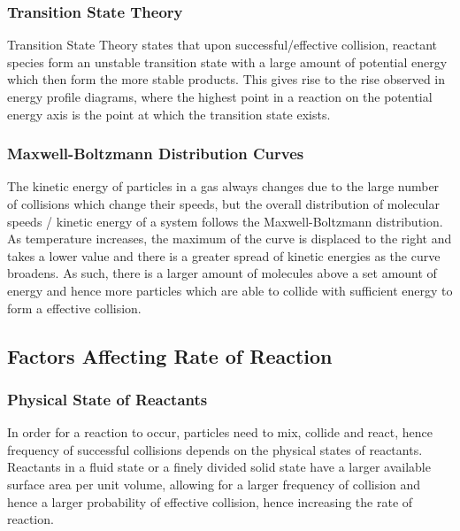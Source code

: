 \documentclass[../main]{subfiles}
\begin{document}
	\subsubsection{Transition State Theory}

	Transition State Theory states that upon successful/effective collision, reactant species form an unstable transition state with a large amount of potential energy which then form the more stable products. This gives rise to the rise observed in energy profile diagrams, where the highest point in a reaction on the potential energy axis is the point at which the transition state exists.

	\subsubsection{Maxwell-Boltzmann Distribution Curves}

	The kinetic energy of particles in a gas always changes due to the large number of collisions which change their speeds, but the overall distribution of molecular speeds / kinetic energy of a system follows the Maxwell-Boltzmann distribution. As temperature increases, the maximum of the curve is displaced to the right and takes a lower value and there is a greater spread of kinetic energies as the curve broadens. As such, there is a larger amount of molecules above a set amount of energy and hence more particles which are able to collide with sufficient energy to form a effective collision.

	\subsection{Factors Affecting Rate of Reaction}

	\subsubsection{Physical State of Reactants}

	In order for a reaction to occur, particles need to mix, collide and react, hence frequency of successful collisions depends on the physical states of reactants. \\

	Reactants in a fluid state or a finely divided solid state have a larger available surface area per unit volume, allowing for a larger frequency of collision and hence a larger probability of effective collision, hence increasing the rate of reaction. \\
\end{document}
